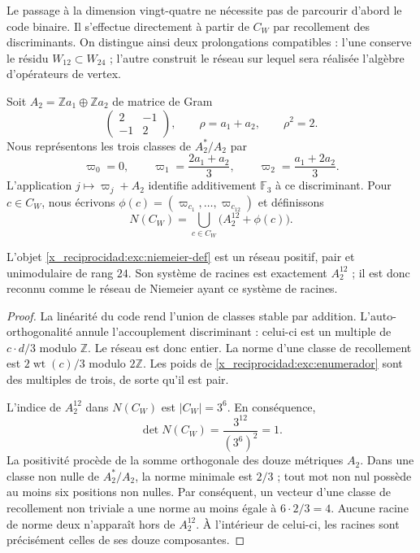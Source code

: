 Le passage à la dimension vingt-quatre ne nécessite pas de parcourir d'abord le
code binaire. Il s'effectue directement à partir de $C_W$ par recollement des
discriminants. On distingue ainsi deux prolongations compatibles :
l'une conserve le résidu $W_{12}\subset W_{24}$ ; l'autre construit le
réseau sur lequel sera réalisée l'algèbre d'opérateurs de vertex.

Soit $A_2=\mathbb Z a_1\oplus\mathbb Z a_2$ de matrice de Gram
\[
 \begin{pmatrix}2&-1\\-1&2\end{pmatrix},
 \qquad \rho=a_1+a_2,\qquad \rho^2=2.
\]
Nous représentons les trois classes de $A_2^*/A_2$ par
\[
 \varpi_0=0,\qquad
 \varpi_1=\frac{2a_1+a_2}{3},\qquad
 \varpi_2=\frac{a_1+2a_2}{3}.
\]
L'application $j\mapsto\varpi_j+A_2$ identifie additivement
$\mathbb F_3$ à ce discriminant. Pour $c\in C_W$, nous écrivons
$\phi(c)=(\varpi_{c_1},\ldots,\varpi_{c_{12}})$ et définissons
\begin{equation}
 N(C_W)=\bigcup_{c\in C_W}\bigl(A_2^{12}+\phi(c)\bigr).
 \label{x_reciprocidad:exc:niemeier-def}
\end{equation}

\begin{theorem}
\label{x_reciprocidad:exc:niemeier-teorema}
L'objet \eqref{x_reciprocidad:exc:niemeier-def} est un réseau positif, pair et
unimodulaire de rang $24$. Son système de racines est exactement
$A_2^{12}$ ; il est donc reconnu comme le réseau de Niemeier ayant
ce système de racines.
\end{theorem}

\begin{proof}
La linéarité du code rend l'union de classes stable par addition. L'auto-orthogonalité annule l'accouplement discriminant : celui-ci est un multiple de $c\cdot d/3$ modulo $\mathbb Z$. Le réseau est donc entier. La norme d'une classe de recollement est $2\operatorname{wt}(c)/3$ modulo $2\mathbb Z$. Les poids de \eqref{x_reciprocidad:exc:enumerador} sont des multiples de trois, de sorte qu'il est pair.

L'indice de $A_2^{12}$ dans $N(C_W)$ est $|C_W|=3^6$. En conséquence,
\[
 \det N(C_W)=\frac{3^{12}}{(3^6)^2}=1.
\]
La positivité procède de la somme orthogonale des douze métriques $A_2$.
Dans une classe non nulle de $A_2^*/A_2$, la norme minimale est $2/3$ ;
tout mot non nul possède au moins six positions non nulles.
Par conséquent, un vecteur d'une classe de recollement non triviale a une norme
au moins égale à $6\cdot2/3=4$. Aucune racine de norme deux n'apparaît hors de
$A_2^{12}$. À l'intérieur de celui-ci, les racines sont précisément celles de ses
douze composantes.
\end{proof}

